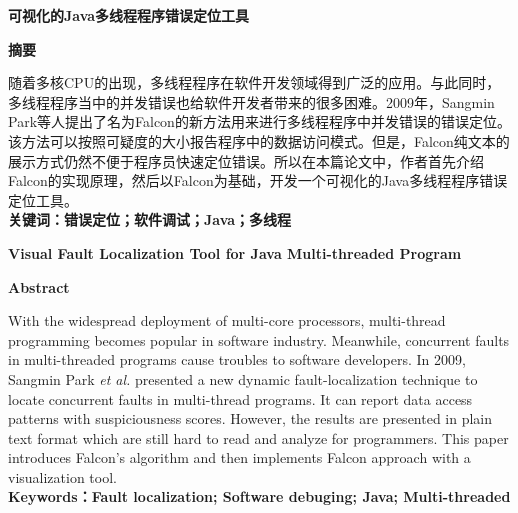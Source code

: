 ﻿\songti
\begin{center}
  \textbf{可视化的Java多线程程序错误定位工具}
\end{center}
\vspace{10mm}
\textbf{摘要}\par
随着多核CPU的出现，多线程程序在软件开发领域得到广泛的应用。与此同时，多线程程序当中的并发错误也给软件开发者带来的很多困难。2009年，Sangmin Park等人提出了名为Falcon的新方法用来进行多线程程序中并发错误的错误定位。该方法可以按照可疑度的大小报告程序中的数据访问模式。但是，Falcon纯文本的展示方式仍然不便于程序员快速定位错误。所以在本篇论文中，作者首先介绍Falcon的实现原理，然后以Falcon为基础，开发一个可视化的Java多线程程序错误定位工具。
\\[10mm]
\textbf{关键词：错误定位；软件调试；Java；多线程}
\newpage

\begin{center}
  \textbf{Visual Fault Localization Tool for Java Multi-threaded Program}
\end{center}
\vspace{10mm}
\textbf{Abstract}\par
With the widespread deployment of multi-core processors, multi-thread programming becomes popular in software industry. Meanwhile, concurrent faults in multi-threaded programs cause troubles to software developers. In 2009, Sangmin Park \textit{et al.} presented a new dynamic fault-localization technique to locate concurrent faults in multi-thread programs. It can report data access patterns with suspiciousness scores. However, the results are presented in plain text format which are still hard to read and analyze for programmers. This paper introduces Falcon's algorithm and then implements Falcon approach with a visualization tool.
\\[10mm]
\textbf{Keywords：Fault localization; Software debuging; Java; Multi-threaded}

